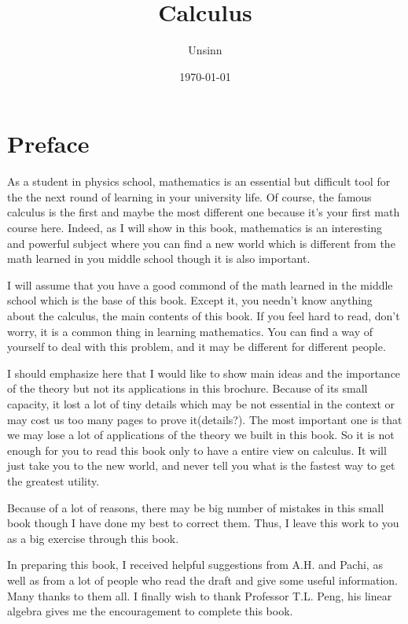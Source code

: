 \documentclass[11pt,a4paper,openany]{book}%
\theoremstyle{plain}%
\begin{document}
\addtocounter{chapter}{-1}
\frontmatter
\title{Calculus}
\author{Unsinn}
\date{\today}
\maketitle %
\chapter*{Preface}
As a student in physics school, mathematics is an essential but difficult tool for the the next round of learning in your university life. Of course, the famous calculus is the first  and maybe the most different one because it's your first math course here. Indeed, as I will show in this book, mathematics is an interesting and powerful subject where you can find a new world which is different from the math learned in you middle school though it is also important.

I will assume that you have a good commond of the math learned in the middle school which is the base of this book. Except it, you needn't know anything about the calculus, the main contents of this book. If you feel hard to read, don't worry, it is a common thing in learning mathematics. You can find a way of yourself to deal with this problem, and it may be different for different people.

I should emphasize here that I would like to show main ideas and the importance of the theory but not its applications in this brochure. Because of its small capacity, it lost a lot of tiny details which may be not essential in the context or may cost us too many pages to prove it(details?). The most important one is that we may lose a lot of applications of the theory we built in this book. So it is not enough for you to read this book only to have a entire view on calculus. It will just take you to the new world, and never tell you what is the fastest way to get the greatest utility.

Because of a lot of reasons, there may be big number of mistakes in this small book though I have done my best to correct them. Thus, I leave this work to you as a big exercise through this book.

In preparing this book, I received helpful suggestions from A.H. and Pachi, as well as from a lot of people who read the draft and give some useful information. Many thanks to them all. I finally wish to thank Professor T.L. Peng, his linear algebra gives me the encouragement to complete this book.
\end{document}
